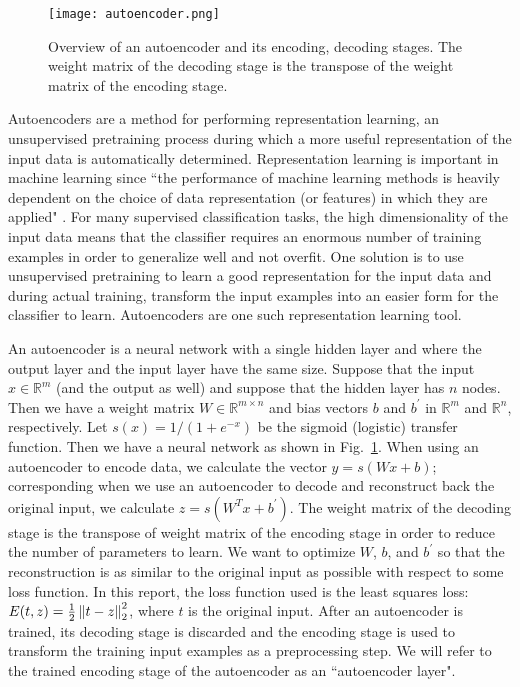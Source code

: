 \begin{figure}[h]
\centering
\texttt{[image: autoencoder.png]}
\caption{Overview of an autoencoder and its encoding, decoding stages. The weight matrix of the decoding stage is the transpose of the weight matrix of the encoding stage.}
\label{fig:autoencoder}
\end{figure}

Autoencoders are a method for performing representation learning, an unsupervised pretraining process during which a more useful representation of the
input data is automatically determined. Representation learning is important in machine learning since ``the performance of 
machine learning methods is heavily dependent on the choice of data representation (or features) in which they are applied" 
\cite{bengio2012rep}. For many supervised classification tasks, the high dimensionality of the input data means that the classifier requires an enormous number of training examples in order to generalize well and not overfit. One solution is to use unsupervised pretraining to learn a good representation for the input data and during actual training, transform the input examples into an easier form for the classifier to learn. Autoencoders are one such representation learning tool.

An autoencoder is a neural network with a single hidden layer and where the output layer and the input layer have the same size. Suppose that the input $x\in\mathbb{R}^m$ (and the output as well) and suppose that the hidden layer has $n$ nodes. Then we have a weight matrix $W\in\mathbb{R}^{m\times n}$ and bias vectors $b$ and $b^{'}$ in $\mathbb{R}^m$ and $\mathbb{R}^n$, respectively. Let $s(x) = 1/(1+e^{-x})$ be the sigmoid (logistic) transfer function. Then we have a neural network as shown in Fig.~\ref{fig:autoencoder}. When using an autoencoder to encode data, we calculate the vector $y=s(Wx + b)$; corresponding when we use an autoencoder to decode and reconstruct back the original input, we calculate $z=s(W^{T}x+b^{'})$. The weight matrix of the decoding stage is the transpose of weight matrix of the encoding stage in order to reduce the number of parameters to learn. We want to optimize $W$, $b$, and $b^{'}$ so that the reconstruction is as similar to the original input as possible with respect to some loss function. In this report, the loss function used is the least squares loss: $E(t,z)=\frac{1}{2}\left\lVert t-z \right\rVert_2^2$, where $t$ is the original input. After an autoencoder is trained, its decoding stage is discarded and the encoding stage is used to transform the training input examples as a preprocessing step. We will refer to the trained encoding stage of the autoencoder as an ``autoencoder layer".

